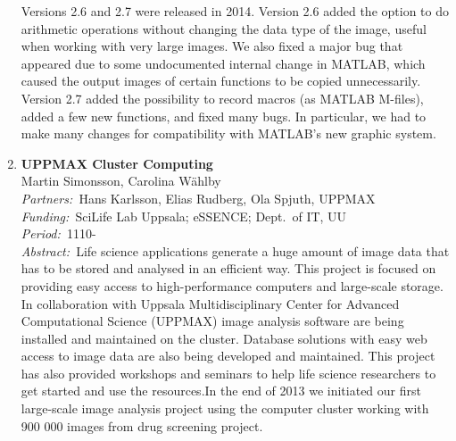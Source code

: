\documentclass[10pt, a4paper]{article}
\newcommand{\aabstract}[1]{\emph{Abstract:~}#1}
\newcommand{\ffunding}[1]{\emph{Funding:~}#1\\}
\newcommand{\ppartners}[1]{\emph{Partners:~}#1\\}
\newcommand{\pperiod}[1]{\emph{Period:~}#1\\}
\begin{document}
\begin{enumerate}
{Versions 2.6 and 2.7 were released in 2014. Version 2.6 added the option to do arithmetic operations without changing the data type of the image, useful when working with very large images. We also fixed a major bug that appeared due to some undocumented internal change in MATLAB, which caused the output images of certain functions to be copied unnecessarily. Version 2.7 added the  possibility to record macros (as MATLAB M-files), added a few new functions, and fixed many bugs. In particular, we had to make many changes for compatibility with MATLAB's new graphic system.} 


\item 
\textbf{UPPMAX Cluster Computing}\\
Martin Simonsson, Carolina W\"{a}hlby\\
\ppartners{Hans Karlsson, Elias Rudberg, Ola Spjuth, UPPMAX}
\ffunding{SciLife Lab Uppsala; eSSENCE; Dept.~of IT, UU}
\pperiod{1110-}
\aabstract{Life science applications generate a huge amount of image data that has to be stored and analysed in an efficient way. This project
is focused on providing easy access to high-performance computers and large-scale storage. In collaboration with Uppsala Multidisciplinary Center for Advanced Computational Science (UPPMAX) image analysis software are being installed and maintained on the cluster. Database solutions with easy web access to image data are also being developed and maintained. This project has also provided workshops and seminars to help life science researchers to get started and use the resources.In the end of 2013 we initiated our first large-scale image analysis project using the computer cluster working with 900 000 images from drug screening project.}

\clearpage

\end{enumerate}
\end{document}
